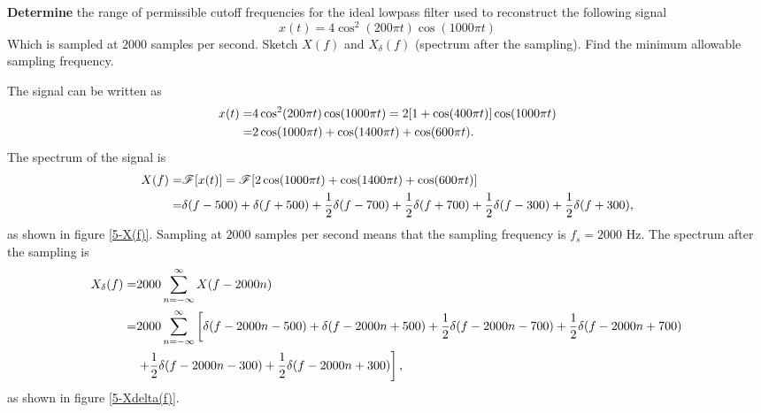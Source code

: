 \documentclass{assignment}
\begin{document}
\begin{prob}[15 pts]
    \textbf{Determine} the range of permissible cutoff frequencies for the ideal lowpass filter used to reconstruct the following signal
    \[
        x(t)=4\cos^2(200\pi t)\cos(1000\pi t)
    \]
    Which is sampled at $2000$ samples per second. Sketch $X(f)$ and $X_{\delta}(f)$ (spectrum after the sampling). Find the minimum allowable sampling frequency.
\end{prob}
\begin{sol}
    The signal can be written as
    \begin{align}
        \notag x(t)=&4\cos^2(200\pi t)\cos(1000\pi t)=2[1+\cos(400\pi t)]\cos(1000\pi t)\\
        =&2\cos(1000\pi t)+\cos(1400\pi t)+\cos(600\pi t).
    \end{align}
    The spectrum of the signal is
    \begin{align}
        \notag X(f)=&\mathscr{F}[x(t)]=\mathscr{F}[2\cos(1000\pi t)+\cos(1400\pi t)+\cos(600\pi t)]\\
        =&\delta(f-500)+\delta(f+500)+\frac{1}{2}\delta(f-700)+\frac{1}{2}\delta(f+700)+\frac{1}{2}\delta(f-300)+\frac{1}{2}\delta(f+300),
    \end{align}
    as shown in figure \ref{5-X(f)}.
    Sampling at $2000$ samples per second means that the sampling frequency is $f_s=2000$ Hz. The spectrum after the sampling is
    \begin{align}
        \notag X_{\delta}(f)=&2000\sum_{n=-\infty}^{\infty}X(f-2000n)\\
        \notag=&2000\sum_{n=-\infty}^{\infty}\left[\delta(f-2000n-500)+\delta(f-2000n+500)+\frac{1}{2}\delta(f-2000n-700)+\frac{1}{2}\delta(f-2000n+700)\right.\\
        &\left.+\frac{1}{2}\delta(f-2000n-300)+\frac{1}{2}\delta(f-2000n+300)\right],
    \end{align}
    as shown in figure \ref{5-Xdelta(f)}.
    \begin{figure}[h]
        \centering

\end{figure}
\end{sol}
\end{document}
